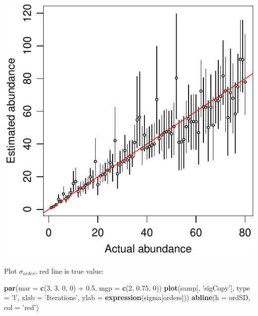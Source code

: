 \documentclass[]{article}
\newenvironment{Shaded}{\begin{snugshade}}{\end{snugshade}}
\newcommand{\KeywordTok}[1]{\textcolor[rgb]{0.13,0.29,0.53}{\textbf{{#1}}}}
\newcommand{\DataTypeTok}[1]{\textcolor[rgb]{0.13,0.29,0.53}{{#1}}}
\newcommand{\DecValTok}[1]{\textcolor[rgb]{0.00,0.00,0.81}{{#1}}}
\newcommand{\FloatTok}[1]{\textcolor[rgb]{0.00,0.00,0.81}{{#1}}}
\newcommand{\StringTok}[1]{\textcolor[rgb]{0.31,0.60,0.02}{{#1}}}
\newcommand{\NormalTok}[1]{{#1}}
\begin{document}
\begin{center}\includegraphics{modelDerivation_normPrior_files/figure-latex/fig_abundEst-1} \end{center}

Plot \(\sigma_{order}\), red line is true value:

\begin{Shaded}
\begin{Highlighting}[]
\KeywordTok{par}\NormalTok{(}\DataTypeTok{mar =} \KeywordTok{c}\NormalTok{(}\DecValTok{3}\NormalTok{, }\DecValTok{3}\NormalTok{, }\DecValTok{0}\NormalTok{, }\DecValTok{0}\NormalTok{) +}\StringTok{ }\FloatTok{0.5}\NormalTok{, }\DataTypeTok{mgp =} \KeywordTok{c}\NormalTok{(}\DecValTok{2}\NormalTok{, }\FloatTok{0.75}\NormalTok{, }\DecValTok{0}\NormalTok{))}
\KeywordTok{plot}\NormalTok{(samp[, }\StringTok{'sigCopy'}\NormalTok{], }\DataTypeTok{type =} \StringTok{'l'}\NormalTok{, }
     \DataTypeTok{xlab =} \StringTok{'Iterations'}\NormalTok{, }\DataTypeTok{ylab =} \KeywordTok{expression}\NormalTok{(sigma[orders]))}
\KeywordTok{abline}\NormalTok{(}\DataTypeTok{h =} \NormalTok{ordSD, }\DataTypeTok{col =} \StringTok{'red'}\NormalTok{)}
\end{Highlighting}
\end{Shaded}
\end{document}
